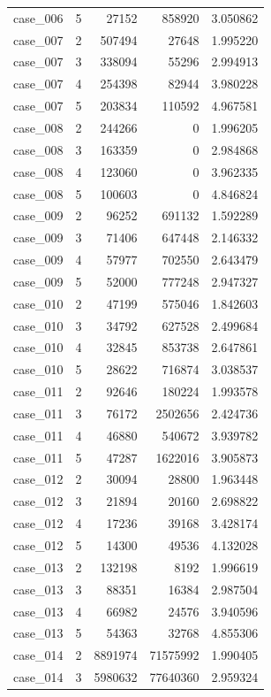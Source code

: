 \begin{longtable}{lrrrr}
case\_006 & 5 & 27152 & 858920 & 3.050862 \\
case\_007 & 2 & 507494 & 27648 & 1.995220 \\
case\_007 & 3 & 338094 & 55296 & 2.994913 \\
case\_007 & 4 & 254398 & 82944 & 3.980228 \\
case\_007 & 5 & 203834 & 110592 & 4.967581 \\
case\_008 & 2 & 244266 & 0 & 1.996205 \\
case\_008 & 3 & 163359 & 0 & 2.984868 \\
case\_008 & 4 & 123060 & 0 & 3.962335 \\
case\_008 & 5 & 100603 & 0 & 4.846824 \\
case\_009 & 2 & 96252 & 691132 & 1.592289 \\
case\_009 & 3 & 71406 & 647448 & 2.146332 \\
case\_009 & 4 & 57977 & 702550 & 2.643479 \\
case\_009 & 5 & 52000 & 777248 & 2.947327 \\
case\_010 & 2 & 47199 & 575046 & 1.842603 \\
case\_010 & 3 & 34792 & 627528 & 2.499684 \\
case\_010 & 4 & 32845 & 853738 & 2.647861 \\
case\_010 & 5 & 28622 & 716874 & 3.038537 \\
case\_011 & 2 & 92646 & 180224 & 1.993578 \\
case\_011 & 3 & 76172 & 2502656 & 2.424736 \\
case\_011 & 4 & 46880 & 540672 & 3.939782 \\
case\_011 & 5 & 47287 & 1622016 & 3.905873 \\
case\_012 & 2 & 30094 & 28800 & 1.963448 \\
case\_012 & 3 & 21894 & 20160 & 2.698822 \\
case\_012 & 4 & 17236 & 39168 & 3.428174 \\
case\_012 & 5 & 14300 & 49536 & 4.132028 \\
case\_013 & 2 & 132198 & 8192 & 1.996619 \\
case\_013 & 3 & 88351 & 16384 & 2.987504 \\
case\_013 & 4 & 66982 & 24576 & 3.940596 \\
case\_013 & 5 & 54363 & 32768 & 4.855306 \\
case\_014 & 2 & 8891974 & 71575992 & 1.990405 \\
case\_014 & 3 & 5980632 & 77640360 & 2.959324 \\

\end{longtable}
